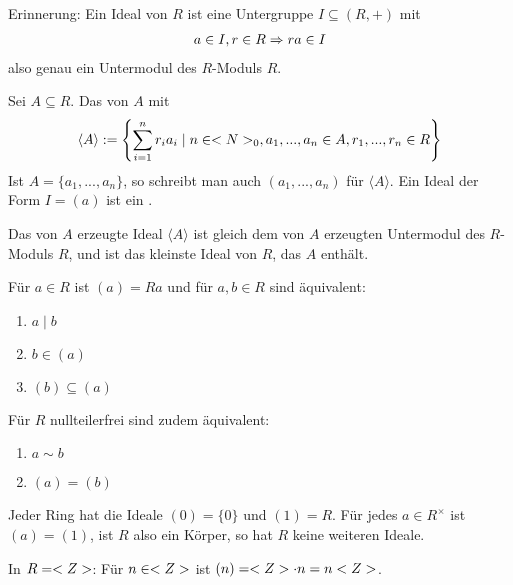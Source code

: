 \begin{remark}
	Erinnerung: Ein Ideal von $R$ ist eine Untergruppe $I\subseteq (R,+)$ mit 
	\begin{align}
		a\in I,r\in R\Rightarrow ra\in I\notag
	\end{align}
	also genau ein Untermodul des $R$-Moduls $R$.
\end{remark}

\begin{definition}
	Sei $A\subseteq R$. Das von $A$  mit
	\begin{align}
		\langle A\rangle :=\left\lbrace \sum_{i=1}^n r_ia_i\mid n\in <N>_0,a_1,...,a_n\in A,r_1,...,r_n\in R\right\rbrace \notag
	\end{align}
	Ist $A=\{a_1,...,a_n\}$, so schreibt man auch $(a_1,...,a_n)$ für $\langle A\rangle$. Ein Ideal der Form $I=(a)$ ist ein .
\end{definition}

\begin{remark}
	Das von $A$ erzeugte Ideal $\langle A\rangle$ ist gleich dem von $A$ erzeugten Untermodul des $R$-Moduls $R$, und ist das kleinste Ideal von $R$, das $A$ enthält.
\end{remark}

\begin{remark}
	Für $a\in R$ ist $(a)=Ra$ und für $a,b\in R$ sind äquivalent:
	\begin{enumerate}
		\item $a\mid b$
		\item $b\in (a)$
		\item $(b)\subseteq (a)$
	\end{enumerate}
	Für $R$ nullteilerfrei sind zudem äquivalent:
	\begin{enumerate}
		\item $a\sim b$
		\item $(a)=(b)$
	\end{enumerate}
\end{remark}

\begin{example}
	Jeder Ring hat die Ideale $(0)=\{0\}$ und $(1)=R$. Für jedes $a\in R^\times$ ist $(a)=(1)$, ist $R$ also ein Körper, so hat $R$ keine weiteren Ideale.
\end{example}

\begin{example}
	In $R=<Z>$: Für $n\in<Z>$ ist $(n)=<Z>\cdot n=n<Z>$.
\end{example}